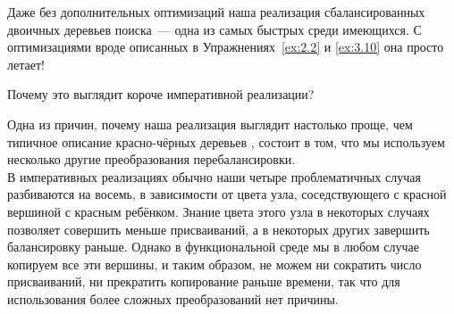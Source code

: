 \begin{frame}[fragile]{}
\begin{figure}[h]
  \centering
  
  \label{fig:3.5}
\end{figure}
\end{frame}

\begin{frame}[fragile]{}
\begin{figure}[h]
  \centering
  
  \label{fig:3.5.2}
\end{figure}
\end{frame}

\begin{frame}[fragile]{}
\begin{hint}
  Даже без дополнительных оптимизаций наша реализация сбалансированных
  двоичных деревьев поиска~--- одна из самых быстрых среди
  имеющихся. С оптимизациями вроде описанных в
  Упражнениях~\ref{ex:2.2} и \ref{ex:3.10} она просто летает!
\end{hint}
\end{frame}


\begin{frame}[fragile]{Почему это выглядит короче императивной реализации?}
\begin{remark}
  Одна из причин, почему наша реализация выглядит настолько проще, чем
  типичное описание красно-чёрных деревьев 
  , состоит в том, что мы
  используем несколько другие преобразования перебалансировки. \\
  
  В
  императивных реализациях обычно наши четыре проблематичных случая
  разбиваются на восемь, в зависимости от цвета узла, соседствующего с
  красной вершиной с красным ребёнком.  Знание цвета этого узла в
  некоторых случаях позволяет совершить меньше присваиваний, а в
  некоторых других завершить балансировку раньше. Однако в
  функциональной среде мы в любом случае копируем все эти вершины, и
  таким образом, не можем ни сократить число присваиваний, ни
  прекратить копирование раньше времени, так что для использования
  более сложных преобразований нет причины.
\end{remark}

\end{frame}


